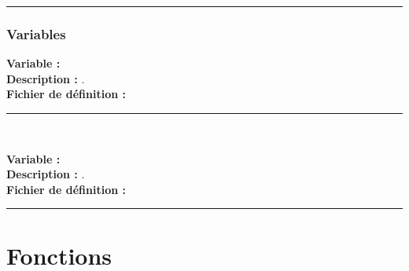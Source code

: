 \documentclass[a4paper,10pt]{article}
\begin{document}


\color{sec3}\par\noindent\rule{\textwidth}{0.4pt}\color{text}

\color{sec3}
\subsubsection{Variables}\color{text}

\textbf{Variable :} \textbf{\color{vars}\color{text}}\\[1\baselineskip]

\textbf{Description :} .\\[1\baselineskip]

\textbf{Fichier de définition :} \textbf{\color{path}\color{text}}\\[1\baselineskip]




\color{vars}\par\noindent\rule{\textwidth}{0.4pt}\\[1\baselineskip]\color{text}

\textbf{Variable :} \textbf{\color{vars}\color{text}}\\[1\baselineskip]

\textbf{Description :} .\\[1\baselineskip]

\textbf{Fichier de définition :} \textbf{\color{path}\color{text}}\\[1\baselineskip]





\color{sec1}\par\noindent\rule{\textwidth}{0.4pt}\color{text}

\color{sec1}
\section{Fonctions}\color{text}

\color{sec2}
\subsection{}\color{text}
\end{document}
